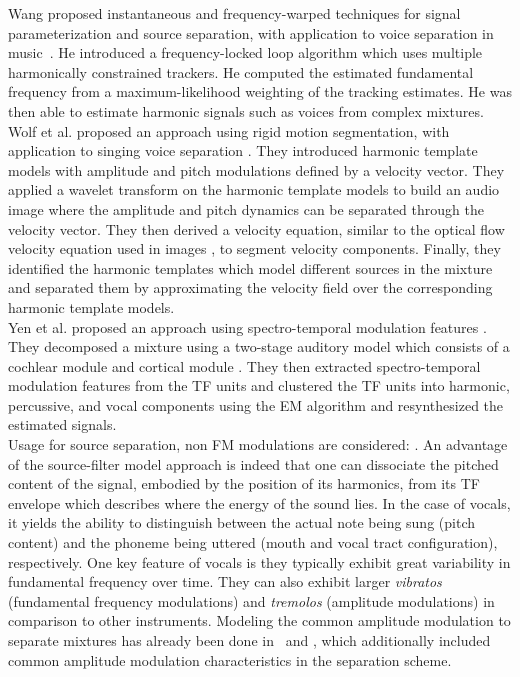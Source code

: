 Wang proposed instantaneous and frequency-warped techniques for signal parameterization and source separation, with application to voice separation in music~\cite{wang94,wang95}.
He introduced a frequency-locked loop algorithm which uses multiple harmonically constrained trackers.
He computed the estimated fundamental frequency from a maximum-likelihood weighting of the tracking estimates. He was then able to estimate harmonic signals such as voices from complex mixtures.\\
Wolf et al. proposed an approach using rigid motion segmentation, with application to singing voice separation \cite{wolf14,wolf16}. They introduced harmonic template models with amplitude and pitch modulations defined by a velocity vector. They applied a wavelet transform \cite{anden14} on the harmonic template models to build an audio image where the amplitude and pitch dynamics can be separated through the velocity vector. They then derived a velocity equation, similar to the optical flow velocity equation used in images \cite{bernard01}, to segment velocity components. Finally, they identified the harmonic templates which model different sources in the mixture and separated them by approximating the velocity field over the corresponding harmonic template models.\\
Yen et al. proposed an approach using spectro-temporal modulation features \cite{yen14,yen15}. They decomposed a mixture using a two-stage auditory model which consists of a cochlear module \cite{chi05} and cortical module \cite{chi99}. They then extracted spectro-temporal modulation features from the TF units and clustered the TF units into harmonic, percussive, and vocal components using the EM algorithm and resynthesized the estimated signals.\\
Usage for source separation, non FM modulations are considered: \cite{hennequin10}.
An advantage of the source-filter model approach is indeed that one can dissociate the pitched content of the signal, embodied by the position of its harmonics, from its TF envelope which describes where the energy of the sound lies. In the case of vocals, it yields the ability to distinguish between the actual note being sung (pitch content) and the phoneme being uttered (mouth and vocal tract configuration), respectively. One key feature of vocals is they typically exhibit great variability in fundamental frequency over time. They can also exhibit larger \textit{vibratos} (fundamental frequency modulations) and \textit{tremolos} (amplitude modulations) in comparison to other instruments.
Modeling the common amplitude modulation to separate mixtures has already been done in~\cite{li07} and
\cite{cano14}, which additionally included common amplitude modulation characteristics in the separation scheme.

